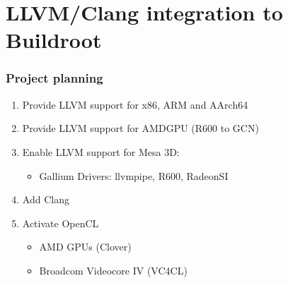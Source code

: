\documentclass{beamer}
\begin{document}
\section{LLVM/Clang integration to Buildroot}

\begin{frame}
\frametitle{Project planning}
\begin{enumerate}
  \item Provide LLVM support for x86, ARM and AArch64
  \item Provide LLVM support for AMDGPU (R600 to GCN)
  \item Enable LLVM support for Mesa 3D:
    \begin{itemize}
      \item Gallium Drivers: llvmpipe, R600, RadeonSI
    \end{itemize}
  \item Add Clang
  \item Activate OpenCL
  \begin{itemize}
    \item AMD GPUs (Clover)
    \item Broadcom Videocore IV (VC4CL)
  \end{itemize}
\end{enumerate}
\end{frame}
\end{document}

